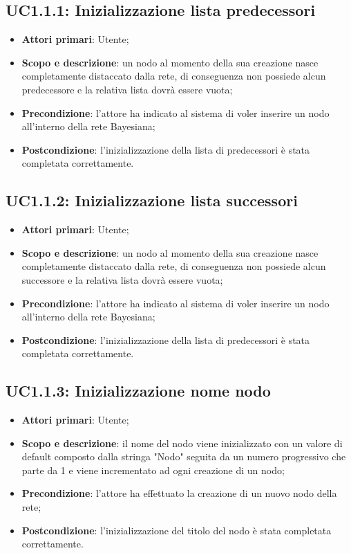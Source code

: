 \subsection{UC1.1.1: Inizializzazione lista predecessori} 
\hypertarget{UC1.1.1}{} 
\begin{itemize} 
	\item{\textbf{Attori primari}: Utente;} 
	\item{\textbf{Scopo e descrizione}: un nodo al momento della sua creazione nasce completamente distaccato dalla rete, di conseguenza non possiede alcun predecessore e la relativa lista dovrà essere vuota;} 
	\item{\textbf{Precondizione}: l'attore ha indicato al sistema di voler inserire un nodo all'interno della rete Bayesiana;} 
	\item{\textbf{Postcondizione}: l'inizializzazione della lista di predecessori è stata completata correttamente.} 
\end{itemize} 
\subsection{UC1.1.2: Inizializzazione lista successori} 
\hypertarget{UC1.1.2}{} 
\begin{itemize} 
	\item{\textbf{Attori primari}: Utente;} 
	\item{\textbf{Scopo e descrizione}: un nodo al momento della sua creazione nasce completamente distaccato dalla rete, di conseguenza non possiede alcun successore e la relativa lista dovrà essere vuota;} 
	\item{\textbf{Precondizione}: l'attore ha indicato al sistema di voler inserire un nodo all'interno della rete Bayesiana;} 
	\item{\textbf{Postcondizione}: l'inizializzazione della lista di predecessori è stata completata correttamente.} 
\end{itemize} 
\subsection{UC1.1.3: Inizializzazione nome nodo}
\hypertarget{UC1.1.3}{}  
\begin{itemize} 
	\item{\textbf{Attori primari}: Utente;} 
	\item{\textbf{Scopo e descrizione}: il nome del nodo viene inizializzato con un valore di default composto dalla stringa "Nodo" seguita da un numero progressivo che parte da 1 e viene incrementato ad ogni creazione di un nodo;} 
	\item{\textbf{Precondizione}: l'attore ha effettuato la creazione di un nuovo nodo della rete;} 
	\item{\textbf{Postcondizione}: l'inizializzazione del titolo del nodo è stata completata correttamente.} 
\end{itemize} 

